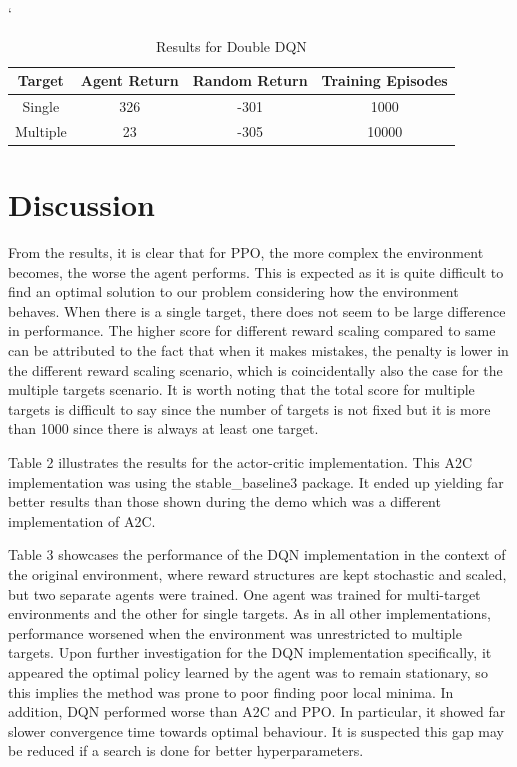 \documentclass{article}
\begin{document}
	`   \begin{table}[h]
		\centering
		\caption[]{Results for Double DQN}\label{Results for PPO}%
		\begin{tabular}{cccc}
			\toprule
			Target & Agent Return & Random Return & Training Episodes \\
			\midrule
			Single & 326 & -301 & 1000 \\
			Multiple & 23 & -305 & 10000 \\
			\bottomrule
		\end{tabular}
		\label{tab: PPO_Table}
	\end{table}
	
	\section{Discussion}
	\label{discussion}
	From the results, it is clear that for PPO, the more complex the environment becomes, the worse the agent performs. This is expected as it is quite difficult to find an optimal solution to our problem considering how the environment behaves. When there is a single target, there does not seem to be large difference in performance. The higher score for different reward scaling compared to same can be attributed to the fact that when it makes mistakes, the penalty is lower in the different reward scaling scenario, which is coincidentally also the case for the multiple targets scenario. It is worth noting that the total score for multiple targets is difficult to say since the number of targets is not fixed but it is more than 1000 since there is always at least one target.
	
	Table 2 illustrates the results for the actor-critic implementation. This A2C implementation was using the stable\_baseline3 package. It ended up yielding far better results than those shown during the demo which was a different implementation of A2C.
	
	Table 3 showcases the performance of the DQN implementation in the context of the original environment, where reward structures are kept stochastic and scaled, but two separate agents were trained. One agent was trained for multi-target environments and the other for single targets. As in all other implementations, performance worsened when the environment was unrestricted to multiple targets. Upon further investigation for the DQN implementation specifically, it appeared the optimal policy learned by the agent was to remain stationary, so this implies the method was prone to poor finding poor local minima. In addition, DQN performed worse than A2C and PPO. In particular, it showed far slower convergence time towards optimal behaviour. It is suspected this gap may be reduced if a search is done for better hyperparameters.
	
\end{document}
